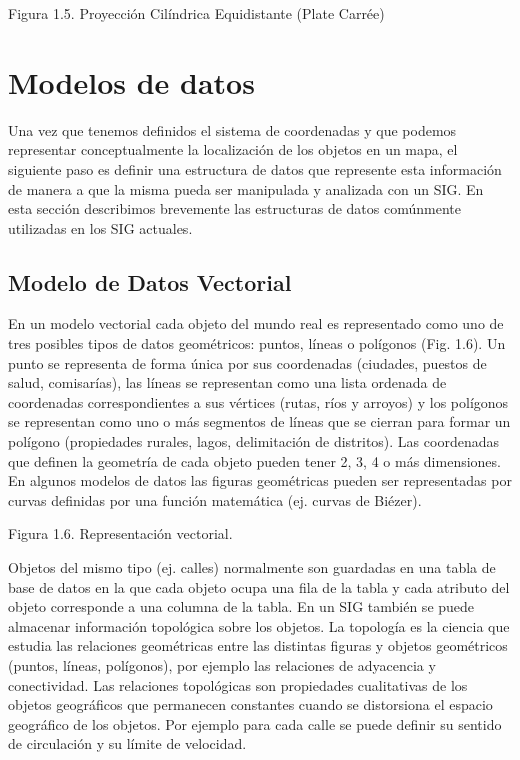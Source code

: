 \documentclass[final,fmstyle]{fpunathesis}
\begin{document}
Figura 1.5. Proyección Cilíndrica Equidistante (Plate Carrée)

\section{Modelos de datos}

Una vez que tenemos definidos el sistema de coordenadas y que podemos representar conceptualmente la localización de los objetos en un mapa, el siguiente paso es definir una estructura de datos que represente esta información de manera a que la misma pueda ser manipulada y analizada con un SIG. En esta sección describimos brevemente las estructuras de datos comúnmente utilizadas en los SIG actuales.

\subsection{Modelo de Datos Vectorial}

En un modelo vectorial cada objeto del mundo real es representado como uno de tres posibles tipos de datos geométricos: puntos, líneas o polígonos (Fig. 1.6). Un punto se representa de forma única por sus coordenadas (ciudades, puestos de salud, comisarías), las líneas se representan como una lista ordenada de coordenadas correspondientes a sus vértices (rutas, ríos y arroyos) y los polígonos se representan como uno o más segmentos de líneas que se cierran para formar un polígono (propiedades rurales, lagos, delimitación de distritos). Las coordenadas que definen la geometría de cada objeto pueden tener 2, 3, 4 o más dimensiones. En algunos modelos de datos las figuras geométricas pueden ser representadas por curvas definidas por una función matemática (ej. curvas de Biézer).

Figura 1.6. Representación vectorial.

Objetos del mismo tipo (ej. calles) normalmente son guardadas en una tabla de base de datos en la que cada objeto ocupa una fila de la tabla y cada atributo del objeto corresponde a una columna de la tabla. En un SIG también se puede almacenar información topológica sobre los objetos. La topología es la ciencia que estudia las relaciones geométricas entre las distintas figuras y objetos geométricos (puntos, líneas, polígonos), por ejemplo las relaciones de adyacencia y conectividad. Las relaciones topológicas son propiedades cualitativas de los objetos geográficos que permanecen constantes cuando se distorsiona el espacio geográfico de los objetos.  Por ejemplo para cada calle se puede definir su sentido de circulación y su límite de velocidad.
\end{document}
